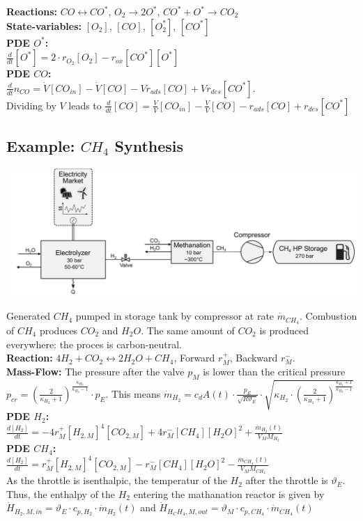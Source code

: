 \documentclass[10pt,a4paper]{scrartcl}
\begin{document}
\begin{multicols*}{3}
\textbf{Reactions:} $CO\leftrightarrow CO^*$, $O_2\rightarrow 2O^*$, $CO^*+O^*\rightarrow CO_2$\\
\textbf{State-variables:} $[O_2]$, $[CO]$, $[O_2^*]$, $[CO^*]$\\
\textbf{PDE $O^*$:} \\ $\frac{d}{dt} [O^*]=2\cdot r_{O_2}[O_2]-r_{ox}[CO^*][O^*]$\\
\textbf{PDE $CO$:} \\ $\frac{d}{dt}n_{CO}=\dot{V}[CO_{in}]-\dot{V}[CO]-Vr_{ads}[CO]+Vr_{des}[CO^*]$.\\
Dividing by $V$ leads to $\frac{d}{dt}[CO]=\frac{\dot{V}}{V}[CO_{in}]-\frac{\dot{V}}{V}[CO]-r_{ads}[CO]+r_{des}[CO^*]$
           
\vfill
\null
\columnbreak

\subsection{Example: $CH_4$ Synthesis}
\begin{center}\includegraphics[width=0.65\columnwidth]{synt.png}\end{center}
Generated $CH_4$ pumped in storage tank by compressor at rate $\dot{m}_{CH_4}$. Combustion of $CH_4$ produces $CO_2$ and $H_2O$. The same amount of $CO_2$ is produced everywhere: the proces is carbon-neutral.\\
\textbf{Reaction:} $4H_2+CO_2\leftrightarrow 2H_2O+CH_4$, Forward $r_M^+$, Backward $r_M^-$. \\
\textbf{Mass-Flow:} The pressure after the valve $p_M$ is lower than the critical pressure $p_{cr}=\left( \frac{2}{\kappa_{H_2}+1} \right)^{\frac{\kappa_{H_2}}{\kappa_{H_2}-1}}\cdot p_E$. This means $\dot{m}_{H_2}=c_dA(t)\cdot \frac{p_E}{\sqrt{R\vartheta_E}}\cdot \sqrt{\kappa_{H_2}\cdot \left( \frac{2}{\kappa_{H_2}+1} \right)^{\frac{\kappa_{H_2}+1}{\kappa_{H_2}-1}}}$\\
\textbf{PDE $H_2$:} \\ $\frac{d[H_2]}{dt}=-4r_M^+[H_{2,M}]^4[CO_{2,M}]+4r_M^-[CH_4][H_2O]^2+\frac{\dot{m}_{H_2}(t)}{V_MM_{H_2}}$\\
\textbf{PDE $CH_4$:} \\ $\frac{d[H_2]}{dt}=r_M^+[H_{2,M}]^4[CO_{2,M}]-r_M^-[CH_4][H_2O]^2-\frac{\dot{m}_{CH_4}(t)}{V_MM_{CH_4}}$\\
As the throttle is isenthalpic, the temperatur of the $H_2$ after the throttle is $\vartheta_E$. Thus, the enthalpy of the $H_2$ entering the mathanation reactor is given by $\dot{H}_{H_2,M,in}=\vartheta_E\cdot c_{p,H_2}\cdot \dot{m}_{H_2}(t)$ and $\dot{H}_{H_CH_4,M,out}=\vartheta_M\cdot c_{p,CH_4}\cdot \dot{m}_{CH_4}(t)$


\end{multicols*}
\end{document}
